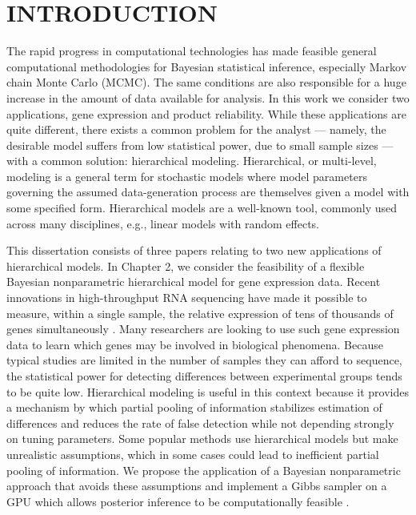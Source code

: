 \chapter{INTRODUCTION}
The rapid progress in computational technologies has made feasible general computational methodologies for Bayesian statistical inference, especially Markov chain Monte Carlo (MCMC). The same conditions are also responsible for a huge increase in the amount of data available for analysis. In this work we consider two applications, gene expression and product reliability. While these applications are quite different, there exists a common problem for the analyst --- namely, the desirable model suffers from low statistical power, due to small sample sizes --- with a common solution: hierarchical modeling. Hierarchical, or multi-level, modeling is a general term for stochastic models where model parameters governing the assumed data-generation process are themselves given a model with some specified form. Hierarchical models are a well-known tool, commonly used across many disciplines, e.g., linear models with random effects.

This dissertation consists of three papers relating to two new applications of hierarchical models. In Chapter 2, we consider the feasibility of a flexible Bayesian nonparametric hierarchical model for gene expression data. Recent innovations in high-throughput RNA sequencing have made it possible to measure, within a single sample, the relative expression of tens of thousands of genes simultaneously \citep{wang2009rna}. Many researchers are looking to use such gene expression data to learn which genes may be involved in biological phenomena. Because typical studies are limited in the number of samples they can afford to sequence, the statistical power for detecting differences between experimental groups tends to be quite low. Hierarchical modeling is useful in this context because it provides a mechanism by which partial pooling of information stabilizes estimation of differences and reduces the rate of false detection while not depending strongly on tuning parameters. Some popular methods use hierarchical models but make unrealistic assumptions, which in some cases could lead to inefficient partial pooling of information. We propose the application of a Bayesian nonparametric approach \citep{ishwaran2001,liu} that avoids these assumptions and implement a Gibbs sampler on a GPU which allows posterior inference to be computationally feasible \citep{suchard,landau}.

